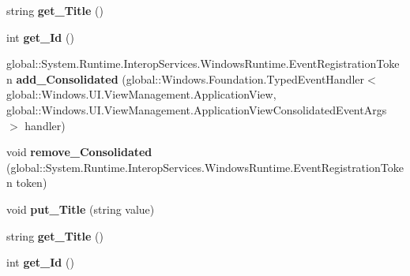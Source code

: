 \begin{DoxyCompactItemize}
string {\bfseries get\+\_\+\+Title} ()
\item 
\mbox{\label{interface_windows_1_1_u_i_1_1_view_management_1_1_i_application_view_a085241cde891f43041555e966151192b}} 
int {\bfseries get\+\_\+\+Id} ()
\item 
\mbox{\label{interface_windows_1_1_u_i_1_1_view_management_1_1_i_application_view_ab9e4087fb6ff5d554c2307d00530d07b}} 
global\+::\+System.\+Runtime.\+Interop\+Services.\+Windows\+Runtime.\+Event\+Registration\+Token {\bfseries add\+\_\+\+Consolidated} (global\+::\+Windows.\+Foundation.\+Typed\+Event\+Handler$<$ global\+::\+Windows.\+U\+I.\+View\+Management.\+Application\+View, global\+::\+Windows.\+U\+I.\+View\+Management.\+Application\+View\+Consolidated\+Event\+Args $>$ handler)
\item 
\mbox{\label{interface_windows_1_1_u_i_1_1_view_management_1_1_i_application_view_af6ab836962164e5617ab1386c2e02849}} 
void {\bfseries remove\+\_\+\+Consolidated} (global\+::\+System.\+Runtime.\+Interop\+Services.\+Windows\+Runtime.\+Event\+Registration\+Token token)
\item 
\mbox{\label{interface_windows_1_1_u_i_1_1_view_management_1_1_i_application_view_a92d3277e8c30de745cb16c868d726dd6}} 
void {\bfseries put\+\_\+\+Title} (string value)
\item 
\mbox{\label{interface_windows_1_1_u_i_1_1_view_management_1_1_i_application_view_a8cf31a988ee9afab65de9ee57bad61ac}} 
string {\bfseries get\+\_\+\+Title} ()
\item 
\mbox{\label{interface_windows_1_1_u_i_1_1_view_management_1_1_i_application_view_a085241cde891f43041555e966151192b}} 
int {\bfseries get\+\_\+\+Id} ()
\item 
\mbox{\label{interface_windows_1_1_u_i_1_1_view_management_1_1_i_application_view_ab9e4087fb6ff5d554c2307d00530d07b}} 

\end{DoxyCompactItemize}
